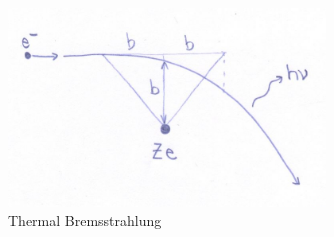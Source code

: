 \documentclass{article}
\begin{document}
\begin{figure}
    \centering
    \includegraphics[width=0.75\textwidth]{figures/800px-Bremsstrahlung.jpg}
    \caption{Thermal Bremsstrahlung}
    \label{fig:thermBremsstrahlung}
\end{figure}
\end{document}
